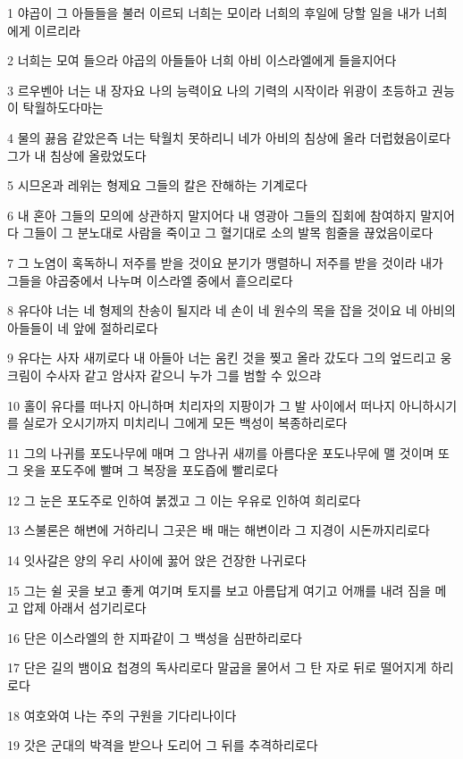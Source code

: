 \par 1 야곱이 그 아들들을 불러 이르되 너희는 모이라 너희의 후일에 당할 일을 내가 너희에게 이르리라
\par 2 너희는 모여 들으라 야곱의 아들들아 너희 아비 이스라엘에게 들을지어다
\par 3 르우벤아 너는 내 장자요 나의 능력이요 나의 기력의 시작이라 위광이 초등하고 권능이 탁월하도다마는
\par 4 물의 끓음 같았은즉 너는 탁월치 못하리니 네가 아비의 침상에 올라 더럽혔음이로다 그가 내 침상에 올랐었도다
\par 5 시므온과 레위는 형제요 그들의 칼은 잔해하는 기계로다
\par 6 내 혼아 그들의 모의에 상관하지 말지어다 내 영광아 그들의 집회에 참여하지 말지어다 그들이 그 분노대로 사람을 죽이고 그 혈기대로 소의 발목 힘줄을 끊었음이로다
\par 7 그 노염이 혹독하니 저주를 받을 것이요 분기가 맹렬하니 저주를 받을 것이라 내가 그들을 야곱중에서 나누며 이스라엘 중에서 흩으리로다
\par 8 유다야 너는 네 형제의 찬송이 될지라 네 손이 네 원수의 목을 잡을 것이요 네 아비의 아들들이 네 앞에 절하리로다
\par 9 유다는 사자 새끼로다 내 아들아 너는 움킨 것을 찢고 올라 갔도다 그의 엎드리고 웅크림이 수사자 같고 암사자 같으니 누가 그를 범할 수 있으랴
\par 10 홀이 유다를 떠나지 아니하며 치리자의 지팡이가 그 발 사이에서 떠나지 아니하시기를 실로가 오시기까지 미치리니 그에게 모든 백성이 복종하리로다
\par 11 그의 나귀를 포도나무에 매며 그 암나귀 새끼를 아름다운 포도나무에 맬 것이며 또 그 옷을 포도주에 빨며 그 복장을 포도즙에 빨리로다
\par 12 그 눈은 포도주로 인하여 붉겠고 그 이는 우유로 인하여 희리로다
\par 13 스불론은 해변에 거하리니 그곳은 배 매는 해변이라 그 지경이 시돈까지리로다
\par 14 잇사갈은 양의 우리 사이에 꿇어 앉은 건장한 나귀로다
\par 15 그는 쉴 곳을 보고 좋게 여기며 토지를 보고 아름답게 여기고 어깨를 내려 짐을 메고 압제 아래서 섬기리로다
\par 16 단은 이스라엘의 한 지파같이 그 백성을 심판하리로다
\par 17 단은 길의 뱀이요 첩경의 독사리로다 말굽을 물어서 그 탄 자로 뒤로 떨어지게 하리로다
\par 18 여호와여 나는 주의 구원을 기다리나이다
\par 19 갓은 군대의 박격을 받으나 도리어 그 뒤를 추격하리로다

